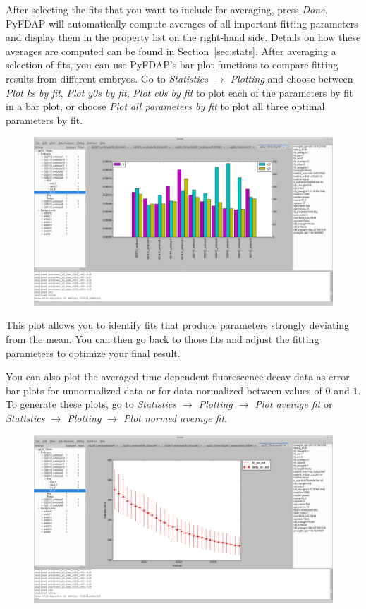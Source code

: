 \documentclass[a4paper,11pt]{article}
\begin{document}
After selecting the fits that you want to include for averaging, press \textit{Done}. PyFDAP will automatically compute averages of all important fitting parameters and display them in the property list on the right-hand side. Details on how these averages are computed can be found in Section~\ref{sec:stats}. After averaging a selection of fits, you can use PyFDAP's bar plot functions to compare fitting results from different embryos. Go to \textit{Statistics $\rightarrow$ Plotting} and choose between \textit{Plot ks by fit}, \textit{Plot y0s by fit}, \textit{Plot c0s by fit} to plot each of the parameters by fit in a bar plot, or choose \textit{Plot all parameters by fit} to plot all three optimal parameters by fit. 
\begin{figure}[H]
  \centering
  \includegraphics[scale=0.18]{figs/all_parameters.png}
 \end{figure}

\noindent This plot allows you to identify fits that produce parameters strongly deviating from the mean. You can then go  back to those fits and adjust the fitting parameters to optimize your final result.

You can also plot the averaged time-dependent fluorescence decay data as error bar plots for unnormalized data or for data normalized between values of $0$ and $1$. To generate these plots, go to \textit{Statistics $\rightarrow$ Plotting $\rightarrow$ Plot average fit} or \textit{Statistics $\rightarrow$ Plotting $\rightarrow$ Plot normed average fit}.  

\begin{figure}[H]
  \centering
  \includegraphics[scale=0.18]{figs/error_bar.png}
 \end{figure}
\end{document}
